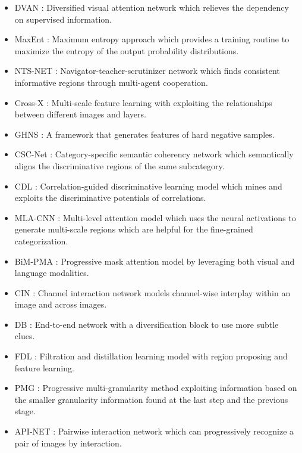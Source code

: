 \documentclass[5p,twocolumn]{elsarticle}
\begin{document}
\begin{itemize}

\item {DVAN  \cite{Zhao2017Diversified}}: Diversified visual attention network which  relieves the dependency on supervised information.
\item {MaxEnt  \cite{Dubey2018Maximum}}: Maximum entropy approach which provides a training routine to maximize the entropy of the output probability distributions.
\item {NTS-NET \cite{Yang2018Learning}}: Navigator-teacher-scrutinizer network which finds consistent informative regions through multi-agent cooperation.
\item {Cross-X  \cite{Luo2019Cross}}:  Multi-scale feature learning with exploiting the relationships between different images and layers.

\item {GHNS \cite{Kim2021}}: A framework that generates features of hard negative samples.
\item {CSC-Net  \cite{Wang2020Category}}:  Category-specific semantic coherency network which semantically aligns the discriminative regions of the same subcategory.
\item {CDL  \cite{Wang2019Weakly}}:  Correlation-guided discriminative learning model which mines and exploits the discriminative potentials of correlations.



\item {MLA-CNN \cite{Ji2021}}: Multi-level attention model which uses the neural activations to generate multi-scale regions which are helpful for the fine-grained categorization.

\item{BiM-PMA \cite{Song2020Bi}}: Progressive mask attention model by leveraging both visual and language modalities.
\item {CIN      \cite{Gao2020Channel}}: Channel interaction network models channel-wise interplay  within an image and across images.
\item {DB      \cite{Sun2020Fine}}: End-to-end network with a diversification block to use more subtle clues.


\item {FDL     \cite{Liu2020Filtration}}: Filtration and distillation learning model with region proposing and feature learning.
\item {PMG     \cite{Du2020Fine}}: Progressive multi-granularity method exploiting information based on the smaller granularity information found at the last step and the previous stage.
\item {API-NET  \cite{Zhuang2020Learning}}: Pairwise interaction network which can progressively recognize a pair of images by interaction.



\end{itemize}
\end{document}

